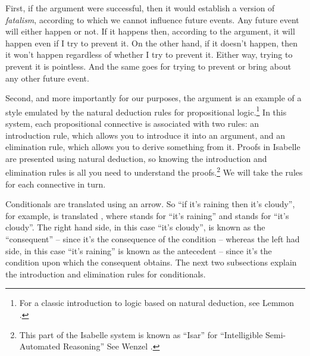 \begin{isabellebody}
\begin{isamarkuptext}
\end{isamarkuptext}\isamarkuptrue%
%
\begin{isamarkuptext}%
First, if the argument were successful, then it would establish a version of \emph{fatalism},
according to which we cannot influence future events. Any future event will either happen or not. If
it happens then, according to the argument, it will happen even if I try to prevent it. On the other
hand, if it doesn't happen, then it won't happen regardless of whether I try to prevent it. Either
way, trying to prevent it is pointless. And the same goes for trying to prevent or bring about any
other future event.%
\end{isamarkuptext}\isamarkuptrue%
%
\begin{isamarkuptext}%
Second, and more importantly for our purposes, the argument is an example of a style emulated
by the natural deduction rules for propositional logic.\footnote{For a classic introduction to logic 
based on natural deduction, see Lemmon \cite{lemmon_beginning_1965}.} In this system, each propositional connective
is associated with two rules: an introduction rule, which allows you to introduce it into an argument, 
and an elimination rule, which allows you to derive something from it. Proofs in Isabelle are presented
using natural deduction, so knowing the introduction and elimination rules is all you need to understand
the proofs.\footnote{This part of the Isabelle system is known as ``Isar'' for ``Intelligible Semi-Automated Reasoning'' 
See Wenzel \cite{wenzel_isabelle/isarversatile_2002}.} We will take the rules for each connective in turn.%
\end{isamarkuptext}\isamarkuptrue%
%
\isadelimdocument
%
\endisadelimdocument
%
\isatagdocument
%
\isamarkuptrue%
%
\endisatagdocument
{\isafolddocument}%
%
\isadelimdocument
%
\endisadelimdocument
%
\begin{isamarkuptext}%
Conditionals are translated using an arrow. So ``if it's raining then it's cloudy'', for
example, is translated , where  stands for ``it's raining'' and 
stands for ``it's cloudy''. The right hand side, in this case ``it's cloudy'', is known as the
``consequent'' -- since it's the consequence of the condition -- whereas the left had side, in this
case ``it's raining'' is known as the antecedent -- since it's the condition upon which the consequent
obtains. The next two subsections explain the introduction and elimination rules for conditionals.%
\end{isamarkuptext}\isamarkuptrue%

\end{isabellebody}

